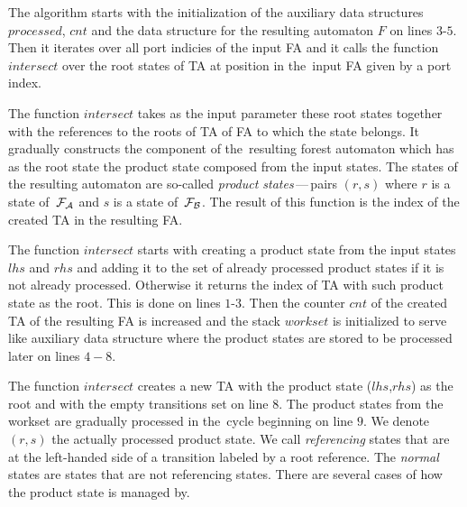 The algorithm starts with the initialization of the auxiliary
data structures $\mathit{processed}$,
$\mathit{cnt}$ and the data structure for the resulting automaton $F$ on lines $3$-$5$.
Then it iterates over all port indicies of the input FA
and it calls the function $\mathit{intersect}$ over the root states of TA at position in
the~input FA given by a port index.

The function $\mathit{intersect}$ takes as the input parameter these root states
together with the references to the roots of TA of FA to which the state belongs.
It gradually constructs the component of the~resulting forest automaton
which has as the root state the product state composed from the input states.
The states of the resulting automaton are so-called \emph{product states}\,---\,pairs $(r,s)$ where $r$ is a state of~$\mathcal{F}_{\mathcal{A}}$
and $s$ is a state of~$\mathcal{F}_{\mathcal{B}}$.
The result of this function is the index of the created TA in the resulting FA.

The function $\mathit{intersect}$ starts with creating a product state from the input states $lhs$ and $rhs$ and
adding it to the set of already processed product states if it is not already processed.
Otherwise it returns the index of TA with such product state as the root.
This is done on lines $1$-$3$.
Then the counter $\mathit{cnt}$ of the created TA of the resulting FA is increased and
the stack $\mathit{workset}$ is initialized to serve like auxiliary data
structure where the product states are stored to be processed later on lines $4-8$.

The function $\mathit{intersect}$ creates a new TA with the product state ($lhs$,$rhs$) as the root
and with the empty transitions set on line $8$.
The product states from the workset are gradually processed in the~cycle beginning
on line $9$.
We denote $(r,s)$ the actually processed product state.
We call \emph{referencing} states that are at the left-handed side
of a transition labeled by a root reference.
The \emph{normal} states are states that are not referencing states.
There are several cases of how the product state is managed by.



